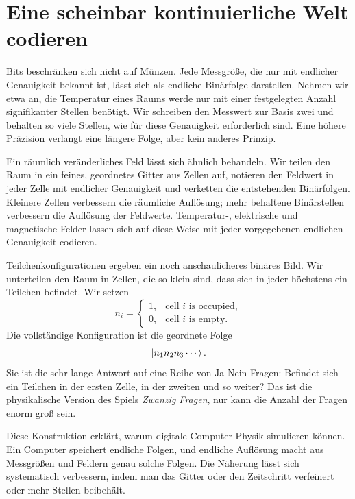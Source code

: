 \section{Eine scheinbar kontinuierliche Welt codieren}

Bits beschränken sich nicht auf Münzen. Jede Messgröße, die nur mit endlicher Genauigkeit bekannt ist, lässt sich als endliche Binärfolge darstellen. Nehmen wir etwa an, die Temperatur eines Raums werde nur mit einer festgelegten Anzahl signifikanter Stellen benötigt. Wir schreiben den Messwert zur Basis zwei und behalten so viele Stellen, wie für diese Genauigkeit erforderlich sind. Eine höhere Präzision verlangt eine längere Folge, aber kein anderes Prinzip.

Ein räumlich veränderliches Feld lässt sich ähnlich behandeln. Wir teilen den Raum in ein feines, geordnetes Gitter aus Zellen auf, notieren den Feldwert in jeder Zelle mit endlicher Genauigkeit und verketten die entstehenden Binärfolgen. Kleinere Zellen verbessern die räumliche Auflösung; mehr behaltene Binärstellen verbessern die Auflösung der Feldwerte. Temperatur-, elektrische und magnetische Felder lassen sich auf diese Weise mit jeder vorgegebenen endlichen Genauigkeit codieren.

Teilchenkonfigurationen ergeben ein noch anschaulicheres binäres Bild. Wir unterteilen den Raum in Zellen, die so klein sind, dass sich in jeder höchstens ein Teilchen befindet. Wir setzen
\begin{equation}
  n_i=
  \begin{cases}
    1,&\text{cell \(i\) is occupied},\\
    0,&\text{cell \(i\) is empty}.
  \end{cases}
  \label{eq:l01-occupancy-bit}
\end{equation}
Die vollständige Konfiguration ist die geordnete Folge
\begin{equation}
  \left\lvert n_1n_2n_3\cdots\right\rangle.
\end{equation}
Sie ist die sehr lange Antwort auf eine Reihe von Ja-Nein-Fragen: Befindet sich ein Teilchen in der ersten Zelle, in der zweiten und so weiter? Das ist die physikalische Version des Spiels \emph{Zwanzig Fragen}, nur kann die Anzahl der Fragen enorm groß sein.

Diese Konstruktion erklärt, warum digitale Computer Physik simulieren können. Ein Computer speichert endliche Folgen, und endliche Auflösung macht aus Messgrößen und Feldern genau solche Folgen. Die Näherung lässt sich systematisch verbessern, indem man das Gitter oder den Zeitschritt verfeinert oder mehr Stellen beibehält.

